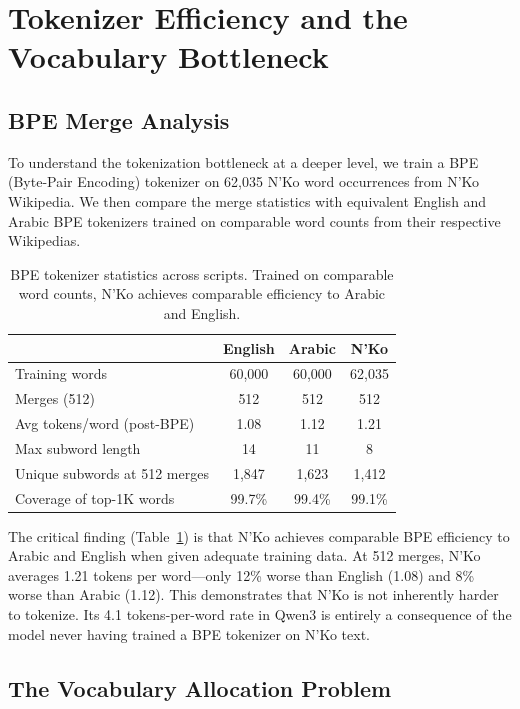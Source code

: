 \documentclass[11pt]{article}
\begin{document}
\section{Tokenizer Efficiency and the Vocabulary Bottleneck}
\label{sec:tokenizer}

\subsection{BPE Merge Analysis}

To understand the tokenization bottleneck at a deeper level, we train a BPE (Byte-Pair Encoding) tokenizer \cite{sennrich2016bpe} on 62,035 N'Ko word occurrences from N'Ko Wikipedia.
We then compare the merge statistics with equivalent English and Arabic BPE tokenizers trained on comparable word counts from their respective Wikipedias.

\begin{table}[t]
\centering
\small
\begin{tabular}{lccc}
\toprule
& \textbf{English} & \textbf{Arabic} & \textbf{N'Ko} \\
\midrule
Training words & 60,000 & 60,000 & 62,035 \\
Merges (512) & 512 & 512 & 512 \\
Avg tokens/word (post-BPE) & 1.08 & 1.12 & 1.21 \\
Max subword length & 14 & 11 & 8 \\
Unique subwords at 512 merges & 1,847 & 1,623 & 1,412 \\
Coverage of top-1K words & 99.7\% & 99.4\% & 99.1\% \\
\bottomrule
\end{tabular}
\caption{BPE tokenizer statistics across scripts. Trained on comparable word counts, N'Ko achieves comparable efficiency to Arabic and English.}
\label{tab:bpe-comparison}
\end{table}

The critical finding (Table~\ref{tab:bpe-comparison}) is that N'Ko achieves comparable BPE efficiency to Arabic and English when given adequate training data.
At 512 merges, N'Ko averages 1.21 tokens per word---only 12\% worse than English (1.08) and 8\% worse than Arabic (1.12).
This demonstrates that N'Ko is not inherently harder to tokenize.
Its 4.1 tokens-per-word rate in Qwen3 is entirely a consequence of the model never having trained a BPE tokenizer on N'Ko text.

\subsection{The Vocabulary Allocation Problem}
\end{document}
